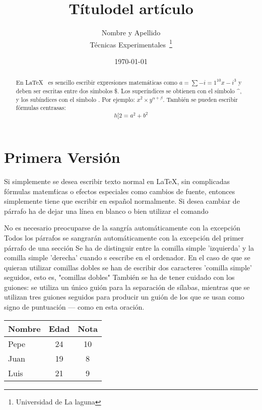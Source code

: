 \documentclass[a4paper,12pt]{article}
\begin{document}
\title{Títulodel artículo}
\author{Nombre y Apellido\\
        Técnicas Experimentales~\footnote{Universidad de La laguna}
        }
\date{\today}
\maketitle
\begin{abstract}
 En \LaTeX{}~\cite{Lam:86} es sencillo escribir expresiones
 matemáticas como $a=\sum-{i=1}^{10} {x-i}^{3}$
 y deben ser escritas entre dos símbolos \$.
 Los superíndices se obtienen con el símbolo \^{}, y 
 los subíndices con el símbolo \-.
 Por ejemplo: $x^2 \times y ^{\alpha + \beta}$.
 También se pueden escribir fórmulas centrasas:
 \[h[ 2=a^2 + b^2\]
 \end{abstract}
  
 \section{Primera Versión} 
 Si simplemente se desea escribir texto normal en LaTeX,
 sin complicadas f\'ormulas matem\'ticas o efectos especiales 
 como cambios de fuente, entonces simplemente tiene que escribir
 en espa\~nol normalmente.
 Si desea cambiar de párrafo ha de dejar una línea en blanco o bien
 utilizar el comando \par
 No es necesario preocuparse de la sangría automáticamente con la excepción
 Todos los párrafos se sangrarán automáticamente con la excepción
 del primer párrafo de una sección
 Se ha de distinguir entre la comilla simple 'izquierda'
 y la comilla simple 'derecha' cuando s eescribe en el ordenador.
 En el caso de que se quieran utilizar comillas dobles se han de 
 escribir dos caracteres 'comilla simple' seguidos, esto es, 
 "comillas dobles"
 También se ha de tener cuidado con los guiones: se utiliza un único
 guión para la separación de sílabas, mientras que se utilizan
 tres guiones seguidos para producir un guión de los que se usan 
 como signo de puntuación --- como en esta oración.
 \bigskip
 \begin{tabular}{|l|c|c|}
 \hline
   Nombre & Edad & Nota \\ \hline
   Pepe   &   24 &   10 \\ \hline
   Juan   &   19 &    8 \\ \hline
   Luis   &   21 &    9 \\ \hline
 \end {tabular}  
 
\end{document}
